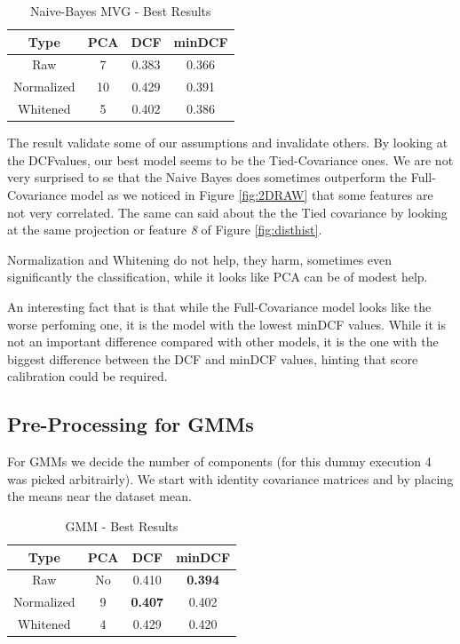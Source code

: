 \documentclass[12pt, twocolumn]{article}
\begin{document}
\begin{table}[H]
    \centering
        \begin{tabular}{||c|c|c|c||}
            \hline
            Type & PCA & DCF & minDCF \\
            \hline
            \hline
            Raw & 7 & 0.383 & 0.366  \\
            Normalized &  10 & 0.429 & 0.391 \\
            Whitened & 5 & 0.402 & 0.386 \\
            \hline
    \end{tabular}
    \caption{Naive-Bayes MVG - Best Results}
    \label{naivetab}
\end{table}

The result validate some of our assumptions and invalidate others.
By looking at the DCF\footnotemark values, our best model seems to be the Tied-Covariance ones.
We are not very surprised to se that the Naive Bayes does sometimes outperform the Full-Covariance model as we noticed in Figure \ref{fig:2DRAW} that some features are not very correlated.
The same can said about the the Tied covariance by looking at the same projection or feature {\it 8} of Figure \ref{fig:disthist}.

Normalization and Whitening do not help, they harm, sometimes even significantly the classification, while it looks like PCA can be of modest help.

An interesting fact that is that while the Full-Covariance model looks like the worse perfoming one, it is the model with the lowest minDCF values.
While it is not an important difference compared with other models, it is the one with the biggest difference between the DCF and minDCF values, hinting that score calibration could be required.

\subsection{Pre-Processing for GMMs}

For GMMs we decide the number of components (for this dummy execution 4 was picked arbitrairly).
We start with identity covariance matrices and by placing the means near the dataset mean.\footnotemark
{}

\begin{table}[H]
    \centering
        \begin{tabular}{||c|c|c|c||}
            \hline
            Type & PCA & DCF & minDCF \\
            \hline
            \hline
            Raw & No & 0.410 & {\bf 0.394}  \\
            Normalized &  9 & {\bf 0.407} & 0.402 \\
            Whitened & 4 & 0.429 & 0.420 \\
            \hline
    \end{tabular}
    \caption{GMM - Best Results}
    \label{tab:gmmresults}
\end{table}
\end{document}
